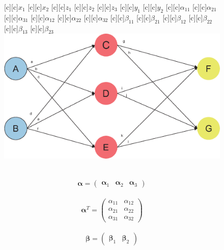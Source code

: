 \documentclass[12pt,a4paper]{article}%
\theoremstyle{definition}
\theoremstyle{plain}
\numberwithin{equation}{section}
\begin{document}
\begin{figure}[H]
\centering
{}[c][c]{$x_{1}$}
[c][c]{$x_{2}$}
[c][c]{$z_{1}$}
[c][c]{$z_{2}$}
[c][c]{$z_{3}$}
[c][c]{$y_{1}$}
[c][c]{$y_{2}$}
[c][c]{\tiny $\alpha_{11}$}
[c][c]{\tiny $\alpha_{21}$}
[c][c]{\tiny $\alpha_{31}$}
[c][c]{\tiny $\alpha_{12}$}
[c][c]{\tiny $\alpha_{22}$}
[c][c]{\tiny $\alpha_{32}$}
[c][c]{\tiny $\beta_{11}$}
[c][c]{\tiny $\beta_{21}$}
[c][c]{\tiny $\beta_{12}$}
[c][c]{\tiny $\beta_{22}$}
[c][c]{\tiny $\beta_{13}$}
[c][c]{\tiny $\beta_{23}$}
\includegraphics[scale=0.6]{images//example-1.eps}
\\~\\
\end{figure}

\begin{gather}
\boldsymbol{\alpha} = \begin{pmatrix}
 \boldsymbol{\alpha}_{1} & \boldsymbol{\alpha}_{2}  & \boldsymbol{\alpha}_{3}
 \end{pmatrix}
\end{gather}

\begin{gather}
\boldsymbol{\alpha}^{T} = \begin{pmatrix}
  \alpha_{11} & \alpha_{12}  \\
  \alpha_{21} & \alpha_{22}  \\
  \alpha_{31} & \alpha_{32}
 \end{pmatrix}
\end{gather}

\begin{gather}
\boldsymbol{\beta} = \begin{pmatrix}
 \boldsymbol{\beta}_{1} & \boldsymbol{\beta}_{2} 
 \end{pmatrix}
\end{gather}
\end{document}
